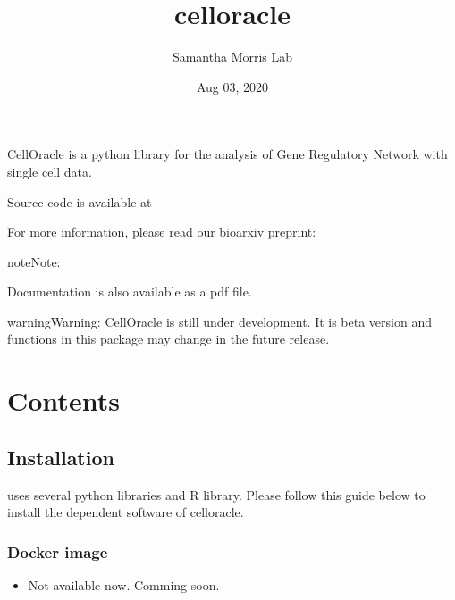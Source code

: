 \documentclass[letterpaper,10pt,english]{sphinxmanual}
\title{celloracle}
\date{Aug 03, 2020}
\author{Samantha Morris Lab}
\begin{document}
\pagestyle{empty}
\sphinxmaketitle
\pagestyle{plain}
\sphinxtableofcontents
\pagestyle{normal}
\label{\detokenize{index::doc}}


CellOracle is a python library for the analysis of Gene Regulatory Network with single cell data.

Source code is available at 

For more information, please read our bioarxiv preprint: 

\begin{sphinxadmonition}{note}{Note:}
\begin{DUlineblock}{0em}
\item[] Documentation is also available as a pdf file.
\end{DUlineblock}

\end{sphinxadmonition}

\begin{sphinxadmonition}{warning}{Warning:}
CellOracle is still under development. It is beta version and functions in this package may change in the future release.
\end{sphinxadmonition}


\chapter{Contents}
\label{\detokenize{index:contents}}

\section{Installation}
\label{\detokenize{installation/index:installation}}\label{\detokenize{installation/index:install}}\label{\detokenize{installation/index::doc}}
 uses several python libraries and R library. Please follow this guide below to install the dependent software of celloracle.


\subsection{Docker image}
\label{\detokenize{installation/index:docker-image}}\label{\detokenize{installation/index:require}}\begin{itemize}
\item {} 
Not available now. Comming soon.

\end{itemize}
\end{document}
